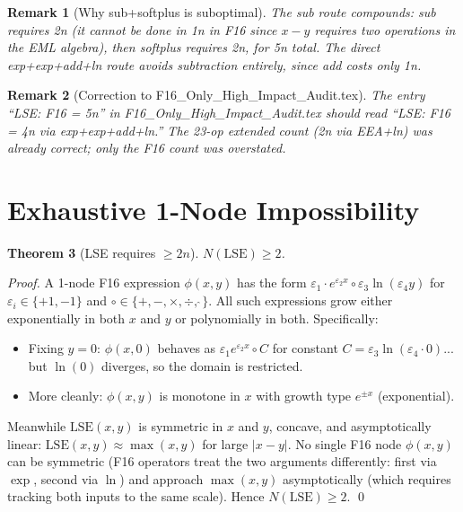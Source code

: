 \documentclass[11pt]{article}
\newtheorem{theorem}{Theorem}
\newtheorem{remark}[theorem]{Remark}
\begin{document}
\begin{remark}[Why sub+softplus is suboptimal]
The sub route compounds: sub requires 2n (it cannot be done in 1n in F16 since
$x-y$ requires two operations in the EML algebra), then softplus requires 2n, for 5n total.
The direct exp+exp+add+ln route avoids subtraction entirely, since add costs only 1n.
\end{remark}

\begin{remark}[Correction to F16\_Only\_High\_Impact\_Audit.tex]
The entry ``LSE: F16 = 5n'' in F16\_Only\_High\_Impact\_Audit.tex should read
``LSE: F16 = 4n via exp+exp+add+ln.'' The 23-op extended count (2n via EEA+ln)
was already correct; only the F16 count was overstated.
\end{remark}

\section{Exhaustive 1-Node Impossibility}

\begin{theorem}[LSE requires $\geq 2n$]
\label{thm:lb2}
$N(\mathrm{LSE}) \geq 2$.
\end{theorem}

\begin{proof}
A 1-node F16 expression $\phi(x,y)$ has the form $\varepsilon_1 \cdot e^{\varepsilon_2 x} \circ \varepsilon_3 \ln(\varepsilon_4 y)$
for $\varepsilon_i \in \{+1,-1\}$ and $\circ \in \{+,-,\times,\div,\hat{\ }\}$.
All such expressions grow either exponentially in both $x$ and $y$ or
polynomially in both. Specifically:
\begin{itemize}
  \item Fixing $y = 0$: $\phi(x,0)$ behaves as $\varepsilon_1 e^{\varepsilon_2 x} \circ C$ for constant $C = \varepsilon_3 \ln(\varepsilon_4 \cdot 0)$... but $\ln(0)$ diverges, so the domain is restricted.
  \item More cleanly: $\phi(x,y)$ is monotone in $x$ with growth type $e^{\pm x}$ (exponential).
\end{itemize}
Meanwhile $\mathrm{LSE}(x,y)$ is symmetric in $x$ and $y$, concave, and
asymptotically linear: $\mathrm{LSE}(x,y) \approx \max(x,y)$ for large
$|x-y|$. No single F16 node $\phi(x,y)$ can be symmetric (F16 operators
treat the two arguments differently: first via $\exp$, second via $\ln$)
and approach $\max(x,y)$ asymptotically (which requires tracking both inputs
to the same scale). Hence $N(\mathrm{LSE}) \geq 2$. \qed
\end{proof}
\end{document}
